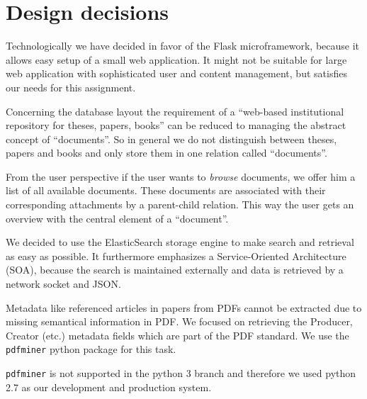 \documentclass{article}
\begin{document}
\section{Design decisions}
%
Technologically we have decided in favor of the Flask microframework,
because it allows easy setup of a small web application. It might not
be suitable for large web application with sophisticated user and content
management, but satisfies our needs for this assignment.

Concerning the database layout the requirement of a ``web-based institutional
repository for theses, papers, books'' can be reduced to managing the abstract
concept of ``documents''. So in general we do not distinguish between theses,
papers and books and only store them in one relation called ``documents''.

From the user perspective if the user wants to \emph{browse} documents,
we offer him a list of all available documents. These documents are associated
with their corresponding attachments by a parent-child relation. This way
the user gets an overview with the central element of a ``document''.

We decided to use the ElasticSearch storage engine to make search and retrieval
as easy as possible. It furthermore emphasizes a Service-Oriented Architecture
(SOA), because the search is maintained externally and data is retrieved by
a network socket and JSON.

Metadata like referenced articles in papers from PDFs cannot be extracted due
to missing semantical information in PDF. We focused on retrieving the Producer,
Creator (etc.) metadata fields which are part of the PDF standard. We use the
\texttt{pdfminer} python package for this task.

\texttt{pdfminer} is not supported in the python 3 branch and therefore we
used python 2.7 as our development and production system.
\end{document}
